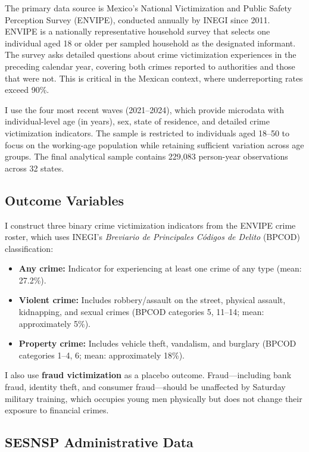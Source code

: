\documentclass[12pt]{article}
\begin{document}
The primary data source is Mexico's National Victimization and Public Safety Perception Survey (ENVIPE), conducted annually by INEGI since 2011. ENVIPE is a nationally representative household survey that selects one individual aged 18 or older per sampled household as the designated informant. The survey asks detailed questions about crime victimization experiences in the preceding calendar year, covering both crimes reported to authorities and those that were not. This is critical in the Mexican context, where underreporting rates exceed 90\%.

I use the four most recent waves (2021--2024), which provide microdata with individual-level age (in years), sex, state of residence, and detailed crime victimization indicators. The sample is restricted to individuals aged 18--50 to focus on the working-age population while retaining sufficient variation across age groups. The final analytical sample contains 229,083 person-year observations across 32 states.

\subsection{Outcome Variables}

I construct three binary crime victimization indicators from the ENVIPE crime roster, which uses INEGI's \textit{Breviario de Principales C{\'o}digos de Delito} (BPCOD) classification:

\begin{itemize}
    \item \textbf{Any crime:} Indicator for experiencing at least one crime of any type (mean: 27.2\%).
    \item \textbf{Violent crime:} Includes robbery/assault on the street, physical assault, kidnapping, and sexual crimes (BPCOD categories 5, 11--14; mean: approximately 5\%).
    \item \textbf{Property crime:} Includes vehicle theft, vandalism, and burglary (BPCOD categories 1--4, 6; mean: approximately 18\%).
\end{itemize}

I also use \textbf{fraud victimization} as a placebo outcome. Fraud---including bank fraud, identity theft, and consumer fraud---should be unaffected by Saturday military training, which occupies young men physically but does not change their exposure to financial crimes.

\subsection{SESNSP Administrative Data}
\end{document}
